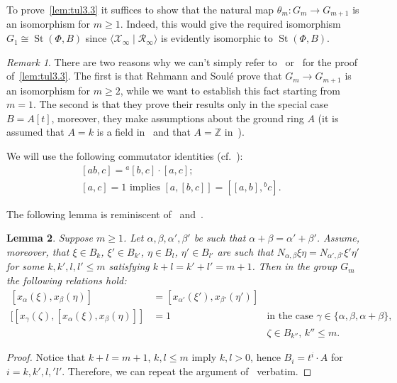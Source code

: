 \documentclass[oneside, 10pt]{amsart}
\DeclareMathOperator{\St}{St}
\newcommand{\XX}[1]{\mathcal{X}_{#1}}
\newcommand{\RR}[1]{\mathcal{R}_{#1}}
\newtheorem{lemma}{Lemma}
\theoremstyle{remark}
\newtheorem{rem}[lemma]{Remark}
\begin{document}
To prove~\cref{lem:tul3.3} it suffices to show that the natural map $\theta_m \colon G_m \to G_{m+1}$ is an isomorphism for $m\geq 1$.
Indeed, this would give the required isomorphism $G_1 \cong \St(\Phi, B)$ since $\langle \XX{\infty} \mid \RR{\infty} \rangle$ is evidently isomorphic to $\St(\Phi, B)$.

\begin{rem}
There are two reasons why we can't simply refer to~\cite{R75} or~\cite{RS76} for the proof of~\cref{lem:tul3.3}.
The first is that Rehmann and Soul{\'e} prove that $G_m \to G_{m+1}$ is an isomorphism for $m\geq 2$, while we want to establish this fact starting from $m = 1$.
The second is that they prove their results only in the special case $B = A[t]$, moreover, they make assumptions about the ground ring $A$
(it is assumed that $A=k$ is a field in~\cite{R75} and that $A=\mathbb{Z}$ in~\cite{RS76}).
\end{rem}

We will use the following commutator identities (cf.~\cite[H1]{R75}):
\begin{align}
 \label{eq:H1ii}  [ab, c] = {}^a[b, c] \cdot [a,c];&\\ %
 \label{eq:H1iii} [a,c]   = 1    \text{ implies } [a, [b,c]] = [[a,b],{}^bc].&
\end{align}

The following lemma is reminiscent of~\cite[Proposition 1.1]{R75} and~\cite[Proposition~3.2.2]{RS76}.
\begin{lemma}
 Suppose $m \geq 1$.
 Let $\alpha, \beta, \alpha', \beta'$ be such that $\alpha + \beta = \alpha' + \beta'$.
 Assume, moreover, that $\xi \in B_k$, $\xi' \in B_{k'}$, $\eta \in B_l$, $\eta' \in B_{l'}$ are such that 
  $N_{\alpha, \beta} \xi \eta = N_{\alpha', \beta'}\xi' \eta'$ for some $k,k',l,l'\leq m$ satisfying $k+l=k'+l' = m+1$.
 Then in the group $G_m$ the following relations hold:
 \begin{align}
  \label{item:i} [x_\alpha(\xi), x_\beta(\eta)] &= [x_{\alpha'}(\xi'), x_{\beta'}(\eta')] & \\
  \label{item:ii} [[x_\gamma(\zeta), [x_\alpha(\xi), x_\beta(\eta)]] & = 1 & \text{in the case } \gamma\in\{\alpha, \beta, \alpha + \beta\},\\
  \nonumber                                     &                          & \text{$\zeta \in B_{k''}$, $k''\leq m$.}
 \end{align}
\end{lemma}
\begin{proof}
 Notice that $k+l = m+1$, $k, l\leq m$ imply $k,l>0$, hence $B_i= t^i \cdot A$ for $i=k,k',l,'l'$.
 Therefore, we can repeat the argument of~\cite[Proposition 1.1]{R75} verbatim.
\end{proof}
\end{document}
